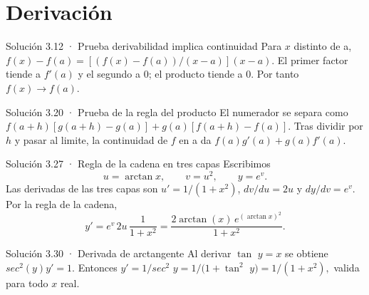 \documentclass[10pt,a4paper,oneside,openany]{book}
\begin{document}
\chapter{Derivación}
\begin{PSevenSolutionFixed}{Solución 3.12 · Prueba derivabilidad implica continuidad}
Para \(x\) distinto de a, \(f(x)-f(a)=[(f(x)-f(a))/(x-a)](x-a)\). El primer factor tiende a \(f'(a)\) y el segundo a \(0\); el producto tiende a \(0\). Por tanto \(f(x)\to f(a)\).
\end{PSevenSolutionFixed}
\begin{PSevenSolutionFixed}{Solución 3.20 · Prueba de la regla del producto}
El numerador se separa como \(f(a+h)[g(a+h)-g(a)]+g(a)[f(a+h)-f(a)]\). Tras dividir por \(h\) y pasar al limite, la continuidad de \(f\) en a da \(f(a)g'(a)+g(a)f'(a)\).
\end{PSevenSolutionFixed}
\begin{PSevenSolutionFixed}{Solución 3.27 · Regla de la cadena en tres capas}
Escribimos
\[
u=\arctan x,\qquad v=u^2,\qquad y=e^v.
\]
Las derivadas de las tres capas son \(u'=1/(1+x^2)\), \(dv/du=2u\) y \(dy/dv=e^v\). Por la regla de la cadena,
\[
y'=e^v\,2u\,\frac1{1+x^2}
=\frac{2\arctan(x)\,e^{(\arctan x)^2}}{1+x^2}.
\]
\end{PSevenSolutionFixed}
\begin{PSevenSolutionFixed}{Solución 3.30 · Derivada de arctangente}
Al derivar \(\tan\) \(y=x\) se obtiene \(sec^{2}(y)y'=1\). Entonces \(y'=1/sec^{2}\) \(y=1/(1+\tan^{2}\) \(y)=1/(1+x^{2}),\) valida para todo \(x\) real.
\end{PSevenSolutionFixed}
\end{document}
